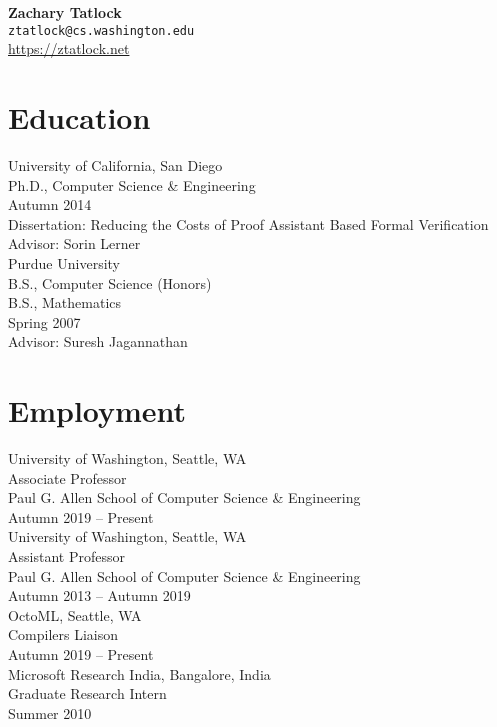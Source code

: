 \documentclass[10pt]{article}
\begin{document}
{\LARGE \textbf{Zachary Tatlock}} \\
\texttt{ztatlock@cs.washington.edu} \\
\url{https://ztatlock.net}


\section*{Education}

University of California, San Diego \\
Ph.D., Computer Science \& Engineering \\
Autumn 2014 \\
Dissertation: Reducing the Costs of Proof Assistant Based Formal Verification \\
Advisor: Sorin Lerner \\

Purdue University \\
B.S., Computer Science (Honors) \\
B.S., Mathematics \\
Spring 2007 \\
Advisor: Suresh Jagannathan


\section*{Employment}

University of Washington, Seattle, WA \\
Associate Professor \\
Paul G. Allen School of Computer Science \& Engineering \\
Autumn 2019 -- Present \\

University of Washington, Seattle, WA \\
Assistant Professor \\
Paul G. Allen School of Computer Science \& Engineering \\
Autumn 2013 -- Autumn 2019 \\

OctoML, Seattle, WA \\
Compilers Liaison \\
Autumn 2019 -- Present \\

Microsoft Research India, Bangalore, India \\
Graduate Research Intern \\
Summer 2010
\end{document}
